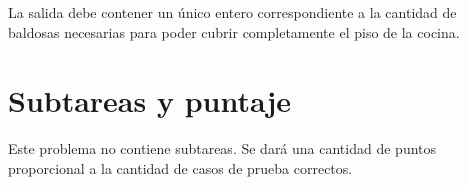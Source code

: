 \documentclass{oci}
\begin{document}
\begin{outputDescription}
  La salida debe contener un único entero correspondiente a la cantidad de
  baldosas necesarias para poder cubrir completamente el piso de la cocina.
\end{outputDescription}

\section*{Subtareas y puntaje}
Este problema no contiene subtareas.
Se dará una cantidad de puntos proporcional a la cantidad de casos de prueba
correctos.
\begin{sampleDescription}
\end{sampleDescription}
\end{document}
